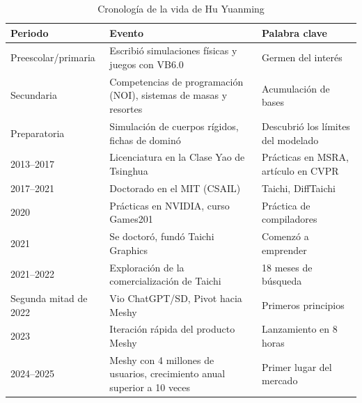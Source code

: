 \begin{table}[H]
\centering
\caption{Cronología de la vida de Hu Yuanming}
\begin{tabular}{lll}
\toprule
\textbf{Periodo} & \textbf{Evento} & \textbf{Palabra clave} \\
\midrule
Preescolar/primaria & Escribió simulaciones físicas y juegos con VB6.0 & Germen del interés \\
Secundaria & Competencias de programación (NOI), sistemas de masas y resortes & Acumulación de bases \\
Preparatoria & Simulación de cuerpos rígidos, fichas de dominó & Descubrió los límites del modelado \\
2013--2017 & Licenciatura en la Clase Yao de Tsinghua & Prácticas en MSRA, artículo en CVPR \\
2017--2021 & Doctorado en el MIT (CSAIL) & Taichi, DiffTaichi \\
2020 & Prácticas en NVIDIA, curso Games201 & Práctica de compiladores \\
2021 & Se doctoró, fundó Taichi Graphics & Comenzó a emprender \\
2021--2022 & Exploración de la comercialización de Taichi & 18 meses de búsqueda \\
Segunda mitad de 2022 & Vio ChatGPT/SD, Pivot hacia Meshy & Primeros principios \\
2023 & Iteración rápida del producto Meshy & Lanzamiento en 8 horas \\
2024--2025 & Meshy con 4 millones de usuarios, crecimiento anual superior a 10 veces & Primer lugar del mercado \\
\bottomrule
\end{tabular}
\end{table}

